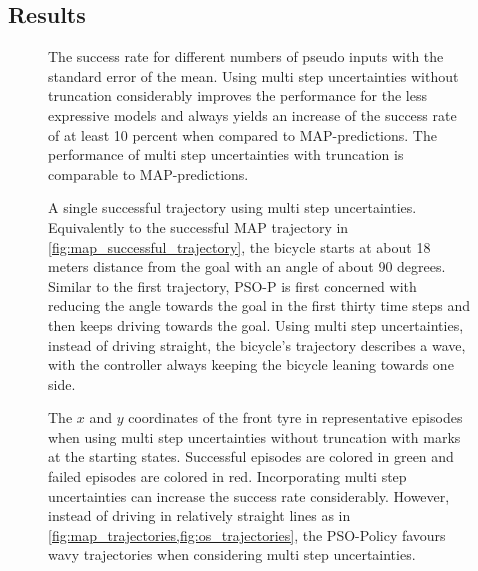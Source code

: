 \subsection{Results}
\begin{figure}[tp]
    \centering
    \caption[Results using multi step uncertainties]{
        The success rate for different numbers of pseudo inputs with the standard error of the mean.
        Using multi step uncertainties without truncation considerably improves the performance for the less expressive models and always yields an increase of the success rate of at least 10 percent when compared to MAP-predictions.
        The performance of multi step uncertainties with truncation is comparable to MAP-predictions.
    }
    \label{fig:ms_results}
\end{figure}
\begin{figure}[p]
    \centering
    \caption[Successful trajectory using multi step uncertainties]{
        A single successful trajectory using multi step uncertainties.
        Equivalently to the successful MAP trajectory in \cref{fig:map_successful_trajectory}, the bicycle starts at about 18 meters distance from the goal with an angle of about 90 degrees.
        Similar to the first trajectory, PSO-P is first concerned with reducing the angle towards the goal in the first thirty time steps and then keeps driving towards the goal.
        Using multi step uncertainties, instead of driving straight, the bicycle's trajectory describes a wave, with the controller always keeping the bicycle leaning towards one side.
    }
    \label{fig:ms_successful_trajectory}
\end{figure}
\begin{figure}[p]
    \centering
    \caption[Episodes using multi step uncertainties without truncation]{
        The $x$ and $y$ coordinates of the front tyre in representative episodes when using multi step uncertainties without truncation with marks at the starting states.
        Successful episodes are colored in green and failed episodes are colored in red.
        Incorporating multi step uncertainties can increase the success rate considerably.
        However, instead of driving in relatively straight lines as in \cref{fig:map_trajectories,fig:os_trajectories}, the PSO-Policy favours wavy trajectories when considering multi step uncertainties.
    }
    \label{fig:ms_trajectories}
\end{figure}
